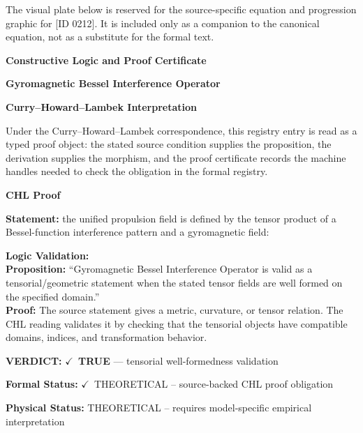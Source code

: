 \begingroup\footnotesize\sloppy
The visual plate below is reserved for the source-specific equation and progression graphic for [ID 0212]. It is included only as a companion to the canonical equation, not as a substitute for the formal text.
\par\endgroup
\ifTZPDarkEdition
{}
\fi

\clearpage
\begingroup\tzpsupportsetup
\noindent\textbf{\fontsize{10.8pt}{12.8pt}\selectfont [ID 0212] Constructive Logic and Proof Certificate}\par
\noindent\textbf{\fontsize{10pt}{12pt}\selectfont Gyromagnetic Bessel Interference Operator}\par
\vspace{0.45em}
\begingroup
\footnotesize
\setlength{\parskip}{0.22em}
\setlength{\parindent}{0pt}
\noindent\textbf{Curry--Howard--Lambek Interpretation}\par
Under the Curry--Howard--Lambek correspondence, this registry entry is read as a typed proof
object: the stated source condition supplies the proposition, the derivation supplies the
morphism, and the proof certificate records the machine handles needed to check the obligation
in the formal registry.

\vspace{0.45em}
\noindent\textbf{CHL Proof}\par
\textbf{Statement:} the unified propulsion field is defined by the tensor product of a Bessel-function
interference pattern and a gyromagnetic field:

\textbf{Logic Validation:}\\
\textbf{Proposition:} ``Gyromagnetic Bessel Interference Operator is valid as a tensorial/geometric statement
when the stated tensor fields are well formed on the specified domain.''\\
\textbf{Proof:} The source statement gives a metric, curvature, or tensor relation. The CHL reading
validates it by checking that the tensorial objects have compatible domains, indices,
and transformation behavior.

\textbf{VERDICT:} \ensuremath{\checkmark}\ \textbf{TRUE} --- tensorial well-formedness validation

\textbf{Formal Status:} \ensuremath{\checkmark}\ THEORETICAL -- source-backed CHL proof obligation

\textbf{Physical Status:} THEORETICAL -- requires model-specific empirical interpretation
\par\vspace{0.45em}
\par
\ifTZPDarkEdition
{}
\fi
\endgroup
\endgroup
